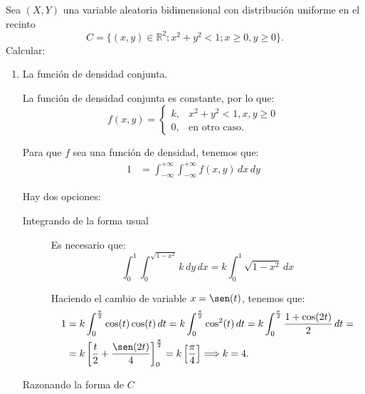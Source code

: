 \begin{ejercicio}
    Sea $(X,Y)$ una variable aleatoria bidimensional con distribución uniforme en el recinto
    \[
        C = \{(x, y) \in \mathbb{R}^2; x^2 + y^2 < 1; x \geq 0, y \geq 0\}.
    \]
    Calcular:
    \begin{enumerate}
        \item La función de densidad conjunta.
        
        La función de densidad conjunta es constante, por lo que:
        \begin{equation*}
            f(x, y) = \begin{cases}
                k, & x^2+y^2<1, x,y\geq 0 \\
                0, & \text{en otro caso}.
            \end{cases}
        \end{equation*}

        Para que $f$ sea una función de densidad, tenemos que:
        \begin{align*}
            1&=\int_{-\infty}^{+\infty} \int_{-\infty}^{+\infty} f(x, y) \, dx \, dy
        \end{align*}

        Hay dos opciones:
        \begin{description}
            \item[Integrando de la forma usual]
            
            Es necesario que:
            \begin{equation*}
                \int_{0}^{1} \int_{0}^{\sqrt{1-x^2}} k \, dy \, dx = k\int_{0}^{1} \sqrt{1-x^2} \, dx
            \end{equation*}

            Haciendo el cambio de variable $x=\sen(t)$, tenemos que:
            \begin{align*}
                1&=k\int_{0}^{\frac{\pi}{2}} \cos(t)\cos(t) \, dt = k\int_{0}^{\frac{\pi}{2}} \cos^2(t) \, dt
                = k\int_{0}^{\frac{\pi}{2}} \dfrac{1+\cos(2t)}{2} \, dt
                =\\&= k\left[\dfrac{t}{2}+\dfrac{\sen(2t)}{4}\right]_0^{\frac{\pi}{2}}
                = k\left[\dfrac{\pi}{4}\right] \Longrightarrow k=4.
            \end{align*}

            \item[Razonando la forma de $C$]
            

\end{description}
\end{enumerate}
\end{ejercicio}

